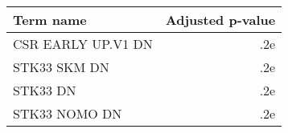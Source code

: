 \begin{tabular}{lr}
\toprule
         Term name &  Adjusted p-value \\
\midrule
CSR EARLY UP.V1 DN &               .2e \\
      STK33 SKM DN &               .2e \\
          STK33 DN &               .2e \\
     STK33 NOMO DN &               .2e \\
\bottomrule
\end{tabular}
